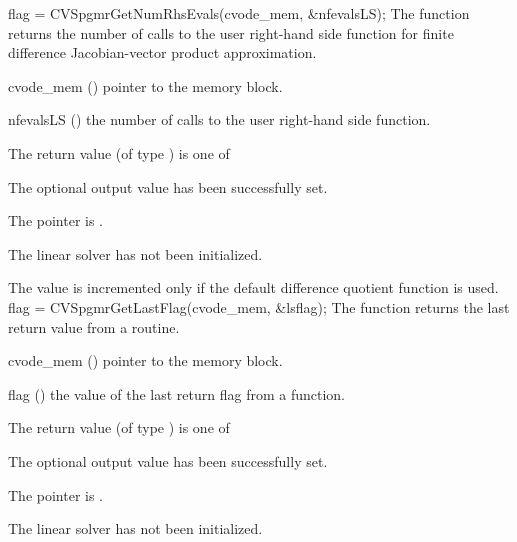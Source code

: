 {}
{
  flag = CVSpgmrGetNumRhsEvals(cvode\_mem, \&nfevalsLS);
}
{
  The function  returns the
  number of calls to the user right-hand side function for
  finite difference Jacobian-vector product approximation.
}
{
  \begin{args}
  \item[cvode\_mem] ()
    pointer to the {\cvode} memory block.
  \item[nfevalsLS] ()
    the number of calls to the user right-hand side function.
  \end{args}
}
{
  The return value  (of type ) is one of
  \begin{args}
  \item[\Id{CVSPGMR\_SUCCESS}] 
    The optional output value has been successfully set.
  \item[\Id{CVSPGMR\_MEM\_NULL}]
    The  pointer is .
  \item[\Id{CVSPGMR\_LMEM\_NULL}]
    The {\cvspgmr} linear solver has not been initialized.
  \end{args}
}
{
  The value  is incremented only if the default 
   difference quotient function is used.
}
{
  flag = CVSpgmrGetLastFlag(cvode\_mem, \&lsflag);
}
{
  The function  returns the
  last return value from a {\cvspgmr} routine. 
}
{
  \begin{args}
  \item[cvode\_mem] ()
    pointer to the {\cvode} memory block.
  \item[flag] ()
    the value of the last return flag from a {\cvspgmr} function.
  \end{args}
}
{
  The return value  (of type ) is one of
  \begin{args}
  \item[\Id{CVSPGMR\_SUCCESS}] 
    The optional output value has been successfully set.
  \item[\Id{CVSPGMR\_MEM\_NULL}]
    The  pointer is .
  \item[\Id{CVSPGMR\_LMEM\_NULL}]
    The {\cvspgmr} linear solver has not been initialized.
  \end{args}
}
